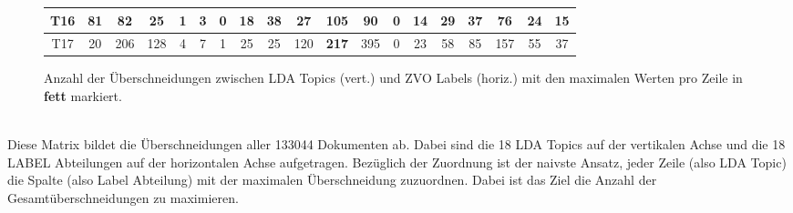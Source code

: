 \documentclass[german,version-2020-11]{uzl-thesis}
\begin{document}
\begin{itemize}
\begin{enumerate}
\begin{figure}[H]
\begin{center}
\begin{tabular}{ccccccccccccccccccc}
\hline 
T16&81& 82& 25& 1& 3& 0& 18& 38& 27& \textbf{105}& 90& 0& 14& 29& 37& 76& 24& 15\\
\hline
T17&20& 206& 128& 4& 7& 1& 25& 25& 120& \textbf{217}& 395& 0& 23& 58& 85& 157& 55& 37\\
\hline
\hline
\end{tabular}
\caption{Anzahl der Überschneidungen zwischen LDA Topics (vert.) und ZVO Labels (horiz.) mit den maximalen Werten pro Zeile in \textbf{fett} markiert.}
\label{fig:matrixnormal}
\end{center}
\end{figure}\\



Diese Matrix bildet die Überschneidungen aller 133044 Dokumenten ab. Dabei sind die 18 LDA Topics auf der vertikalen Achse und die 18 LABEL Abteilungen auf der horizontalen Achse aufgetragen. Bezüglich der Zuordnung ist der naivste Ansatz, jeder Zeile (also LDA Topic) die Spalte (also Label Abteilung) mit der maximalen Überschneidung zuzuordnen. Dabei ist das Ziel die Anzahl der Gesamtüberschneidungen zu maximieren. \\



\end{enumerate}
\end{itemize}
\end{document}
